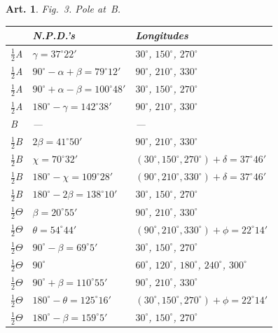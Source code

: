 \documentclass[11pt,a4paper]{article}
\theoremstyle{plain}
\newtheorem{art}{Art.}[section]
\begin{document}
\begin{art}
Fig.~3. Pole at~B.

\begin{center}
\begin{tabular}{|l|l|l|}
\hline
& N.P.D.'s & Longitudes \\
\hline
$\frac{1}{2}$A & $\gamma = 37^\circ 22'$ & $30^\circ$, $150^\circ$, $270^\circ$ \\
$\frac{1}{2}$A & $90^\circ - \alpha + \beta = 79^\circ 12'$ & $90^\circ$, $210^\circ$, $330^\circ$ \\
$\frac{1}{2}$A & $90^\circ + \alpha - \beta = 100^\circ 48'$ & $30^\circ$, $150^\circ$, $270^\circ$ \\
$\frac{1}{2}$A & $180^\circ - \gamma = 142^\circ 38'$ & $90^\circ$, $210^\circ$, $330^\circ$ \\
\hline
B & --- & --- \\
\hline
$\frac{1}{2}$B & $2\beta = 41^\circ 50'$ & $90^\circ$, $210^\circ$, $330^\circ$ \\
$\frac{1}{2}$B & $\chi = 70^\circ 32'$ & $(30^\circ, 150^\circ, 270^\circ) + \delta = 37^\circ 46'$ \\
$\frac{1}{2}$B & $180^\circ - \chi = 109^\circ 28'$ & $(90^\circ, 210^\circ, 330^\circ) + \delta = 37^\circ 46'$ \\
$\frac{1}{2}$B & $180^\circ - 2\beta = 138^\circ 10'$ & $30^\circ$, $150^\circ$, $270^\circ$ \\
\hline
$\frac{1}{2}\Theta$ & $\beta = 20^\circ 55'$ & $90^\circ$, $210^\circ$, $330^\circ$ \\
$\frac{1}{2}\Theta$ & $\theta = 54^\circ 44'$ & $(90^\circ, 210^\circ, 330^\circ) + \phi = 22^\circ 14'$ \\
$\frac{1}{2}\Theta$ & $90^\circ - \beta = 69^\circ 5'$ & $30^\circ$, $150^\circ$, $270^\circ$ \\
$\frac{1}{2}\Theta$ & $90^\circ$ & $60^\circ$, $120^\circ$, $180^\circ$, $240^\circ$, $300^\circ$ \\
$\frac{1}{2}\Theta$ & $90^\circ + \beta = 110^\circ 55'$ & $90^\circ$, $210^\circ$, $330^\circ$ \\
$\frac{1}{2}\Theta$ & $180^\circ - \theta = 125^\circ 16'$ & $(30^\circ, 150^\circ, 270^\circ) + \phi = 22^\circ 14'$ \\
$\frac{1}{2}\Theta$ & $180^\circ - \beta = 159^\circ 5'$ & $30^\circ$, $150^\circ$, $270^\circ$ \\
\hline
\end{tabular}
\end{center}
\end{art}
\end{document}
